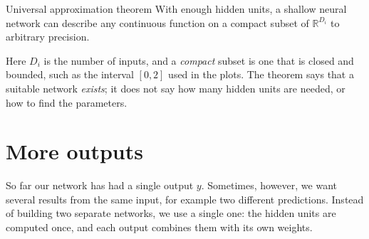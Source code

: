 \documentclass[a4paper,12pt,oneside]{report}
\begin{document}
\begin{framedthm}{Universal approximation theorem}\label{thm:universal-approximation}
With enough hidden units, a shallow neural network can describe any
continuous function on a compact subset of $\mathbb{R}^{D_i}$ to
arbitrary precision.
\end{framedthm}

Here $D_i$ is the number of inputs, and a \emph{compact} subset is one
that is closed and bounded, such as the interval $[0,2]$ used in the
plots. The theorem says that a suitable network \emph{exists}; it does
not say how many hidden units are needed, or how to find the
parameters.

\clearpage
\section{More outputs}

So far our network has had a single output $y$. Sometimes, however,
we want several results from the same input, for example two different
predictions. Instead of building two separate networks, we use a
single one: the hidden units are computed once, and each output
combines them with its own weights.
\end{document}
